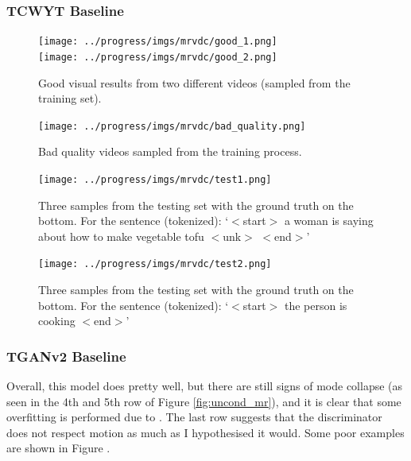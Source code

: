 \documentclass{report}
\theoremstyle{plain}
\theoremstyle{definition}
\theoremstyle{remark}
\numberwithin{equation}{section}
\numberwithin{figure}{section}
\newcommand{\<}{\langle}
\renewcommand{\>}{\rangle}
\begin{document}
\subsubsection{TCWYT Baseline}

\begin{figure}[H]
    \centering
    \caption{Good visual results from two different videos (sampled from the training set).}
    \texttt{[image: ../progress/imgs/mrvdc/good\_1.png]}\\
    \texttt{[image: ../progress/imgs/mrvdc/good\_2.png]}
\end{figure}

\begin{figure}[H]
    \centering
    \caption{Bad quality videos sampled from the training process.}
    \texttt{[image: ../progress/imgs/mrvdc/bad\_quality.png]}
\end{figure}

\begin{figure}[H]
    \centering
    \caption{Three samples from the testing set with the ground truth on the bottom. For the sentence (tokenized): `$<$start$>$ a woman is saying about how to make vegetable tofu $<$unk$>$ $<$end$>$'}
    \texttt{[image: ../progress/imgs/mrvdc/test1.png]}
\end{figure}

\begin{figure}[H]
    \centering
    \caption{Three samples from the testing set with the ground truth on the bottom. For the sentence (tokenized): `$<$start$>$ the person is cooking $<$end$>$'}
    \texttt{[image: ../progress/imgs/mrvdc/test2.png]}
\end{figure}

\subsubsection{TGANv2 Baseline}

Overall, this model does pretty well, but there are still signs of mode collapse (as seen in the 4th and 5th row of Figure \ref{fig:uncond_mr}), and it is clear that some overfitting is performed due to . The last row suggests that the discriminator does not respect motion as much as I hypothesised it would. Some poor examples are shown in Figure \label{fig:uncond_bad}.
\end{document}
